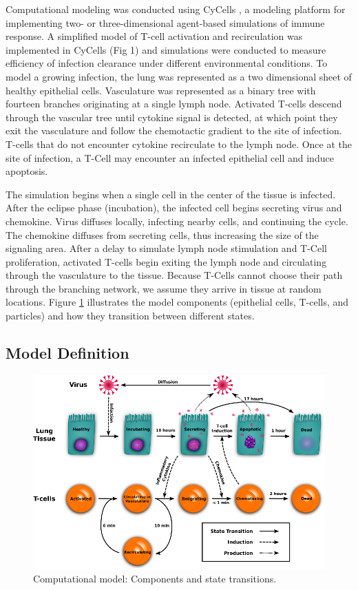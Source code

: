 \documentclass[10pt]{article}
\begin{document}
Computational modeling was conducted using CyCells \cite{Warrender2006}, a modeling platform for implementing two- or three-dimensional agent-based simulations of immune response. A simplified model of T-cell activation and recirculation was implemented in CyCells (Fig 1) and simulations were conducted to measure efficiency of infection clearance under different environmental conditions. To model a growing infection, the lung was represented as a two dimensional sheet of healthy epithelial cells. Vasculature was represented as a binary tree with fourteen branches originating at a single lymph node. Activated T-cells descend through the vascular tree until cytokine signal is detected, at which point they exit the vasculature and follow the chemotactic gradient to the site of infection. T-cells that do not encounter cytokine recirculate to the lymph node. Once at the site of infection, a T-Cell may encounter an infected epithelial cell and induce apoptosis.

The simulation begins when a single cell in the center of the tissue is infected. After the eclipse phase (incubation), the infected cell begins secreting virus and chemokine. Virus diffuses locally, infecting nearby cells, and continuing the cycle. The chemokine diffuses from secreting cells, thus increasing the size of the signaling area. After a delay to simulate lymph node stimulation and T-Cell proliferation, activated T-cells begin exiting the lymph node and circulating through the vasculature to the tissue. Because T-Cells cannot choose their path through the branching network, we assume they arrive in tissue at random locations. Figure \ref{fig:modelchart} illustrates the model components 
(epithelial cells, T-cells, and particles) and how they transition between different states.


\subsection*{Model Definition}

\begin{figure}[ht!]
\begin{center}
\includegraphics[width=\textwidth]{ModelChart}
\end{center}
\caption{Computational model: Components and state transitions.}
\label{fig:modelchart}
\end{figure}
\end{document}
